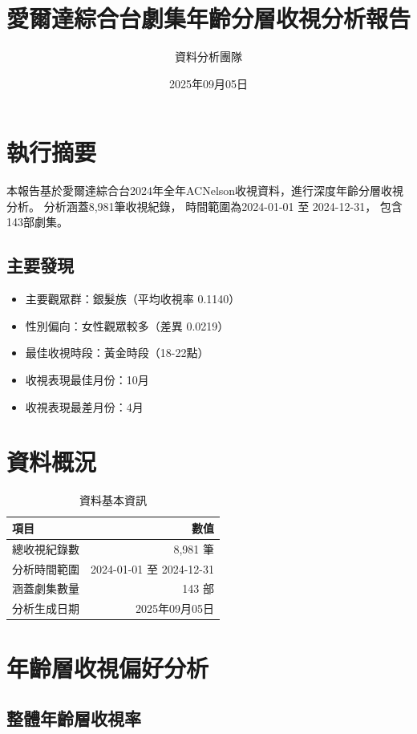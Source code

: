\documentclass[12pt,a4paper]{article}
\title{\textbf{\Large 愛爾達綜合台劇集年齡分層收視分析報告}}
\author{資料分析團隊}
\date{2025年09月05日}
\begin{document}
\maketitle

\tableofcontents
\newpage

\section{執行摘要}

本報告基於愛爾達綜合台2024年全年ACNelson收視資料，進行深度年齡分層收視分析。
分析涵蓋8,981筆收視紀錄，
時間範圍為2024-01-01 至 2024-12-31，
包含143部劇集。

\subsection{主要發現}
\begin{itemize}
    \item 主要觀眾群：銀髮族（平均收視率 0.1140）
    \item 性別偏向：女性觀眾較多（差異 0.0219）
    \item 最佳收視時段：黃金時段（18-22點）
    \item 收視表現最佳月份：10月
    \item 收視表現最差月份：4月
\end{itemize}

\section{資料概況}

\begin{table}[H]
\centering
\caption{資料基本資訊}
\begin{tabular}{lr}
\toprule
項目 & 數值 \\
\midrule
總收視紀錄數 & 8,981 筆 \\
分析時間範圍 & 2024-01-01 至 2024-12-31 \\
涵蓋劇集數量 & 143 部 \\
分析生成日期 & 2025年09月05日 \\
\bottomrule
\end{tabular}
\end{table}

\section{年齡層收視偏好分析}

\subsection{整體年齡層收視率}
\end{document}

